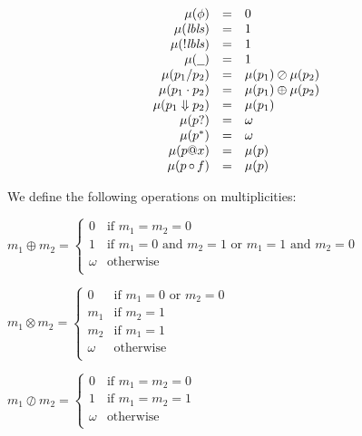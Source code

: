 \documentclass{article}
\makeatletter
\newcommand{\lbls}{\ensuremath{\mathit{lbls}}}
\newcommand{\pseq}[2]{\ensuremath{#1 \cdot #2}}
\newcommand{\por}[2]{\ensuremath{#1/#2}}
\newcommand{\children}[2]{\ensuremath{#1} \Downarrow #2}
\newcommand{\maybe}[1]{\ensuremath{#1?}}
\newcommand{\many}[1]{\ensuremath{#1^*}}
\newcommand{\any}{\ensuremath{\text{\underline{\hspace{0.6em}}}}}
\newcommand{\bind}[2]{\ensuremath{#1@#2}}
\newcommand{\paction}[2]{\ensuremath{#1\mathop{\circ} #2}}
\makeatother
\begin{document}
\[
  \begin{array}{rcl}
    \mu(\phi)                & = & 0                         \\
    \mu(\lbls)               & = & 1                         \\
    \mu(!\lbls)              & = & 1                         \\
    \mu(\any)                & = & 1                         \\
    \mu(\por{p_1}{p_2})      & = & \mu(p_1) \oslash \mu(p_2) \\
    \mu(\pseq{p_1}{p_2})     & = & \mu(p_1) \oplus \mu(p_2)  \\
    \mu(\children{p_1}{p_2}) & = & \mu(p_1)                  \\
    \mu(\maybe{p})           & = & \omega                    \\
    \mu(\many{p})            & = & \omega                    \\
    \mu(\bind{p}{x})         & = & \mu(p)                    \\
    \mu(\paction{p}{f})      & = & \mu(p)                    \\
  \end{array}
\]

We define the following operations on multiplicities:

$
  m_1 \oplus m_2 =
  \begin{cases}
    0 & \text{if $m_1 = m_2 = 0$}\\
    1 & \text{if $m_1 = 0$ and $m_2 = 1$ or $m_1 = 1$ and $m_2 = 0$}\\
    \omega & \text{otherwise}\\
  \end{cases}
$

$
  m_1 \otimes m_2 =
  \begin{cases}
    0 & \text{if $m_1 = 0$ or $m_2 = 0$}\\
    m_1 & \text{if $m_2 = 1$}\\
    m_2 & \text{if $m_1 = 1$}\\
    \omega & \text{otherwise}\\
  \end{cases}
$

$
  m_1 \oslash m_2 =
  \begin{cases}
    0 & \text{if $m_1 = m_2 = 0$}\\
    1 & \text{if $m_1 = m_2 = 1$}\\
    \omega & \text{otherwise}\\
  \end{cases}
$
\end{document}
